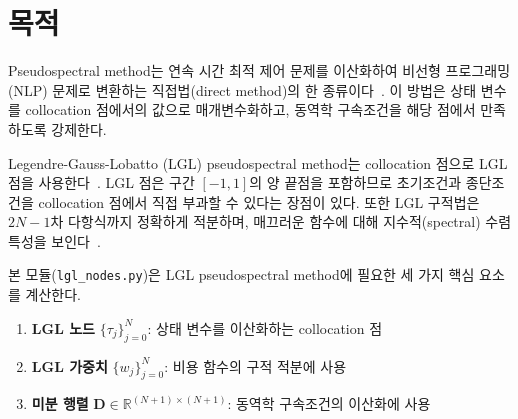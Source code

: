 \documentclass[11pt]{article}
\begin{document}
\drawborder
\thispagestyle{firstpage}

\def\lighterdate{February 12, 2026}

\begin{abstract}
Pseudospectral method는 연속 시간 최적 제어 문제를 이산화하여 비선형 프로그래밍(NLP) 문제로 변환하는 직접법(direct method)의 한 종류이다. Legendre-Gauss-Lobatto (LGL) pseudospectral method는 collocation 점으로 LGL 점을 사용하며, 구간 $[-1, 1]$의 양 끝점을 포함하므로 초기조건과 종단조건을 직접 부과할 수 있다. 본 보고서는 LGL pseudospectral method에 필요한 세 가지 핵심 요소---LGL 노드, LGL 가중치, 미분 행렬---의 수학적 배경을 정리하고, \texttt{lgl\_nodes.py} 구현과의 대응 관계 및 수치 검증 결과를 기술한다.
\end{abstract}

\section{목적}
\label{sec:purpose}

Pseudospectral method는 연속 시간 최적 제어 문제를 이산화하여 비선형 프로그래밍(NLP) 문제로 변환하는 직접법(direct method)의 한 종류이다~\cite{Rao2025}. 이 방법은 상태 변수를 collocation 점에서의 값으로 매개변수화하고, 동역학 구속조건을 해당 점에서 만족하도록 강제한다.

Legendre-Gauss-Lobatto (LGL) pseudospectral method는 collocation 점으로 LGL 점을 사용한다~\cite{Fahroo2002}. LGL 점은 구간 $[-1, 1]$의 양 끝점을 포함하므로 초기조건과 종단조건을 collocation 점에서 직접 부과할 수 있다는 장점이 있다. 또한 LGL 구적법은 $2N-1$차 다항식까지 정확하게 적분하며, 매끄러운 함수에 대해 지수적(spectral) 수렴 특성을 보인다~\cite{Canuto2006}.

본 모듈(\texttt{lgl\_nodes.py})은 LGL pseudospectral method에 필요한 세 가지 핵심 요소를 계산한다.

\begin{enumerate}[nosep]
  \item \textbf{LGL 노드} $\{\tau_j\}_{j=0}^{N}$: 상태 변수를 이산화하는 collocation 점
  \item \textbf{LGL 가중치} $\{w_j\}_{j=0}^{N}$: 비용 함수의 구적 적분에 사용
  \item \textbf{미분 행렬} $\mathbf{D} \in \mathbb{R}^{(N+1)\times(N+1)}$: 동역학 구속조건의 이산화에 사용
\end{enumerate}
\end{document}
